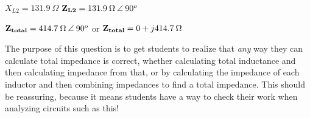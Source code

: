 $X_{L2} = 131.9 \> \Omega$ \hskip 10pt ${\bf Z_{L2}} = 131.9 \> \Omega \> \angle \> 90^o$

${\bf Z_{total}} = 414.7 \> \Omega \> \angle \> 90^o$ or ${\bf Z_{total}} = 0 + j414.7 \> \Omega$







The purpose of this question is to get students to realize that {\it any} way they can calculate total impedance is correct, whether calculating total inductance and then calculating impedance from that, or by calculating the impedance of each inductor and then combining impedances to find a total impedance.  This should be reassuring, because it means students have a way to check their work when analyzing circuits such as this!




